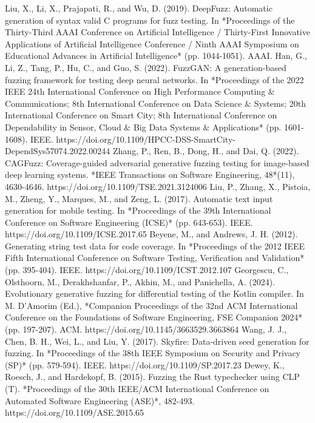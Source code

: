 \documentclass[10.5pt,compsoc]{CjC}
\theoremstyle{mystyle}
\begin{document}
\begin{thebibliography}{99}
  Liu, X., Li, X., Prajapati, R., and Wu, D. (2019). DeepFuzz: Automatic generation of syntax valid C programs for fuzz testing. In *Proceedings of the Thirty-Third AAAI Conference on Artificial Intelligence / Thirty-First Innovative Applications of Artificial Intelligence Conference / Ninth AAAI Symposium on Educational Advances in Artificial Intelligence* (pp. 1044-1051). AAAI.
  Han, G., Li, Z., Tang, P., Hu, C., and Guo, S. (2022). FuzzGAN: A generation-based fuzzing framework for testing deep neural networks. In *Proceedings of the 2022 IEEE 24th International Conference on High Performance Computing $\&$ Communications; 8th International Conference on Data Science $\&$ Systems; 20th International Conference on Smart City; 8th International Conference on Dependability in Sensor, Cloud $\&$ Big Data Systems $\&$ Applications* (pp. 1601-1608). IEEE. https://doi.org/10.1109/HPCC-DSS-SmartCity-DependSys57074.2022.00244
  Zhang, P., Ren, B., Dong, H., and Dai, Q. (2022). CAGFuzz: Coverage-guided adversarial generative fuzzing testing for image-based deep learning systems. *IEEE Transactions on Software Engineering, 48*(11), 4630-4646. https://doi.org/10.1109/TSE.2021.3124006
  Liu, P., Zhang, X., Pistoia, M., Zheng, Y., Marques, M., and Zeng, L. (2017). Automatic text input generation for mobile testing. In *Proceedings of the 39th International Conference on Software Engineering (ICSE)* (pp. 643-653). IEEE. https://doi.org/10.1109/ICSE.2017.65
  Beyene, M., and Andrews, J. H. (2012). Generating string test data for code coverage. In *Proceedings of the 2012 IEEE Fifth International Conference on Software Testing, Verification and Validation* (pp. 395-404). IEEE. https://doi.org/10.1109/ICST.2012.107
  Georgescu, C., Olsthoorn, M., Derakhshanfar, P., Akhin, M., and Panichella, A. (2024). Evolutionary generative fuzzing for differential testing of the Kotlin compiler. In M. D'Amorim (Ed.), *Companion Proceedings of the 32nd ACM International Conference on the Foundations of Software Engineering, FSE Companion 2024* (pp. 197-207). ACM. https://doi.org/10.1145/3663529.3663864
  Wang, J. J., Chen, B. H., Wei, L., and Liu, Y. (2017). Skyfire: Data-driven seed generation for fuzzing. In *Proceedings of the 38th IEEE Symposium on Security and Privacy (SP)* (pp. 579-594). IEEE. https://doi.org/10.1109/SP.2017.23
  Dewey, K., Roesch, J., and Hardekopf, B. (2015). Fuzzing the Rust typechecker using CLP (T). *Proceedings of the 30th IEEE/ACM International Conference on Automated Software Engineering (ASE)*, 482-493. https://doi.org/10.1109/ASE.2015.65

\end{thebibliography}
\end{document}
